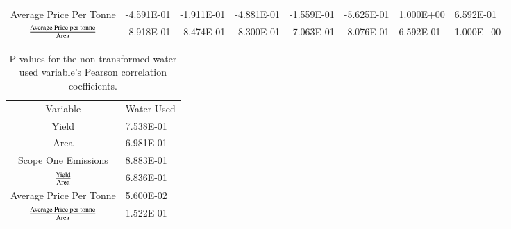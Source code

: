 \documentclass[review,12pt,authoryear]{elsarticle}
\begin{document}
\begin{linenumbers}
\begin{table}[]
\begin{tabular}{clllllll}
    Average Price Per Tonne                            & -4.591E-01                & -1.911E-01               & -4.881E-01                     & -1.559E-01                              & -5.625E-01                                         & 1.000E+00                                   & 6.592E-01                                                              \\
    ${\textrm{Average Price per tonne}\over\textrm{Area}}$ & -8.918E-01                & -8.474E-01               & -8.300E-01                     & -7.063E-01                              & -8.076E-01                                         & 6.592E-01                                   & 1.000E+00                                                             
    \end{tabular}
    \end{table}

    \begin{table}[]
      \caption{P-values for the non-transformed water used variable's Pearson correlation coefficients.}
    \label{tab:tab4}
      \begin{tabular}{cl}
      Variable                                           & Water Used \\
      Yield                                              & 7.538E-01  \\
      Area                                               & 6.981E-01  \\
      Scope One Emissions                                & 8.883E-01  \\
      $\textrm{Yield}\over\textrm{Area}$                     & 6.836E-01  \\
      Average Price Per Tonne                            & 5.600E-02  \\
      ${\textrm{Average Price per tonne}\over\textrm{Area}}$ & 1.522E-01 
      \end{tabular}
      \end{table}


\end{linenumbers}
\end{document}
